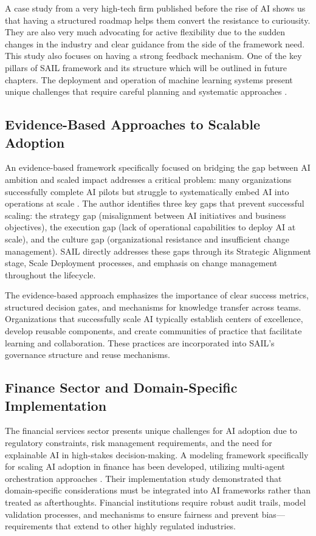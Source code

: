 \documentclass[]{imc-inf}
\begin{document}
A case study from a very high-tech firm \citep{Tamburri2022} published before the rise of AI shows us that having a structured roadmap helps them convert the resistance to curiousity. They are also very much advocating for active flexibility due to the sudden changes in the industry and clear guidance from the side of the framework need. This study also focuses on having a strong feedback mechanism. One of the key pillars of SAIL framework and its structure which will be outlined in future chapters. The deployment and operation of machine learning systems present unique challenges that require careful planning and systematic approaches \citep{Baier2019}.


\subsection{Evidence-Based Approaches to Scalable Adoption}

An evidence-based framework specifically focused on bridging the gap between AI ambition and scaled impact addresses a critical problem: many organizations successfully complete AI pilots but struggle to systematically embed AI into operations at scale \citep{Pandiri2024}. The author identifies three key gaps that prevent successful scaling: the strategy gap (misalignment between AI initiatives and business objectives), the execution gap (lack of operational capabilities to deploy AI at scale), and the culture gap (organizational resistance and insufficient change management). SAIL directly addresses these gaps through its Strategic Alignment stage, Scale Deployment processes, and emphasis on change management throughout the lifecycle.

The evidence-based approach emphasizes the importance of clear success metrics, structured decision gates, and mechanisms for knowledge transfer across teams. Organizations that successfully scale AI typically establish centers of excellence, develop reusable components, and create communities of practice that facilitate learning and collaboration. These practices are incorporated into SAIL's governance structure and reuse mechanisms.

\subsection{Finance Sector and Domain-Specific Implementation}

The financial services sector presents unique challenges for AI adoption due to regulatory constraints, risk management requirements, and the need for explainable AI in high-stakes decision-making. A modeling framework specifically for scaling AI adoption in finance has been developed, utilizing multi-agent orchestration approaches \citep{Sepanosian2024}. Their implementation study demonstrated that domain-specific considerations must be integrated into AI frameworks rather than treated as afterthoughts. Financial institutions require robust audit trails, model validation processes, and mechanisms to ensure fairness and prevent bias---requirements that extend to other highly regulated industries.
\end{document}
